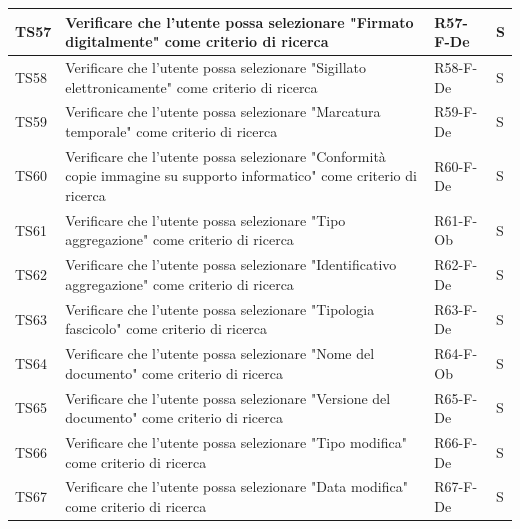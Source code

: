 \documentclass[a4paper,12pt]{article}
\begin{document}
\begin{longtable}{|M{1.2cm}|M{6.3cm}|M{2.5cm}|M{1.5cm}|}
                TS57 & Verificare che l'utente possa selezionare "Firmato digitalmente" come criterio di ricerca & R57-F-De & S \\
                \hline

                TS58 & Verificare che l'utente possa selezionare "Sigillato elettronicamente" come criterio di ricerca & R58-F-De & S \\
                \hline

                TS59 & Verificare che l'utente possa selezionare "Marcatura temporale" come criterio di ricerca & R59-F-De & S \\
                \hline

                TS60 & Verificare che l'utente possa selezionare "Conformità copie immagine su supporto informatico" come criterio di ricerca & R60-F-De & S \\
                \hline

                TS61 & Verificare che l'utente possa selezionare "Tipo aggregazione" come criterio di ricerca & R61-F-Ob & S \\
                \hline

                TS62 & Verificare che l'utente possa selezionare "Identificativo aggregazione" come criterio di ricerca & R62-F-De & S \\
                \hline

                TS63 & Verificare che l'utente possa selezionare "Tipologia fascicolo" come criterio di ricerca & R63-F-De & S \\
                \hline

                TS64 & Verificare che l'utente possa selezionare "Nome del documento" come criterio di ricerca & R64-F-Ob & S \\
                \hline

                TS65 & Verificare che l'utente possa selezionare "Versione del documento" come criterio di ricerca & R65-F-De & S \\
                \hline

                TS66 & Verificare che l'utente possa selezionare "Tipo modifica" come criterio di ricerca & R66-F-De & S \\
                \hline

                TS67 & Verificare che l'utente possa selezionare "Data modifica" come criterio di ricerca & R67-F-De & S \\
                \hline


\end{longtable}
\end{document}
